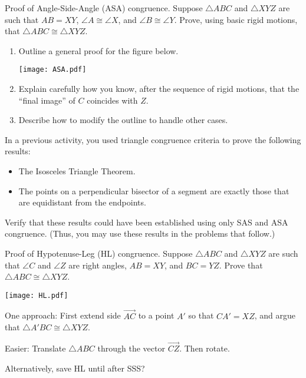 \documentclass[instructornotes,nooutcomes]{ximera}
\begin{document}
\newpage
\begin{problem}
Proof of Angle-Side-Angle (ASA) congruence.  Suppose $\triangle ABC$ and $\triangle XYZ$ are such that $AB=XY$, $\angle A \cong \angle X$, and $\angle B \cong \angle Y$.  Prove, using basic rigid motions, that $\triangle ABC \cong \triangle XYZ$.  
\begin{enumerate}
\item Outline a general proof for the figure below.  
\begin{image}
\texttt{[image: ASA.pdf]}
\end{image}
\item Explain carefully how you know, after the sequence of rigid motions, that the ``final image'' of $C$ coincides with $Z$.  
\item Describe how to modify the outline to handle other cases. 
\end{enumerate}
\vfill
\end{problem}

\newpage

\begin{problem}
In a previous activity, you used triangle congruence criteria to prove the following results: 
\begin{itemize}
\item The Isosceles Triangle Theorem.
\item The points on a perpendicular bisector of a segment are exactly those that are equidistant from the endpoints.
\end{itemize}
Verify that these results could have been established using only SAS and ASA congruence.  (Thus, you may use these results in the problems that follow.) 
\vspace{1in}
\end{problem}

\begin{problem}
Proof of Hypotenuse-Leg (HL) congruence.  Suppose $\triangle ABC$ and $\triangle XYZ$ are such that $\angle C$ and $\angle Z$ are right angles, $AB=XY$, and $BC=YZ$.  Prove that $\triangle ABC \cong \triangle XYZ$.  
\begin{image}
\texttt{[image: HL.pdf]}
\end{image}
\vfill
\end{problem}

\begin{teachingnote}
One approach:  First extend side $\overrightarrow{AC}$ to a point $A'$ so that $CA'=XZ$, and argue that $\triangle A'BC \cong \triangle XYZ$.

Easier:  Translate $\triangle ABC$ through the vector $\overrightarrow{CZ}$.  Then rotate.

Alternatively, save HL until after SSS?
\end{teachingnote}
\end{document}
